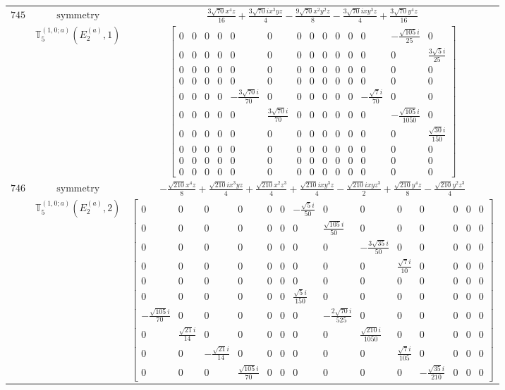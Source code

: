 \documentclass[fleqn,8pt,landscape]{jsarticle}
\begin{document}
\begin{longtable}{ccc}
$ 745 $ & $ \text{symmetry} $ & $ \frac{3 \sqrt{70} x^{4} z}{16} + \frac{3 \sqrt{70} i x^{3} y z}{4} - \frac{9 \sqrt{70} x^{2} y^{2} z}{8} - \frac{3 \sqrt{70} i x y^{3} z}{4} + \frac{3 \sqrt{70} y^{4} z}{16} $ \\
$  $ & $ \mathbb{T}_{5}^{(1,0;a)}(E_{2}^{(a)},1) $ & $ \begin{bmatrix} 0 & 0 & 0 & 0 & 0 & 0 & 0 & 0 & 0 & 0 & 0 & 0 & - \frac{\sqrt{105} i}{25} & 0 \\ 0 & 0 & 0 & 0 & 0 & 0 & 0 & 0 & 0 & 0 & 0 & 0 & 0 & \frac{3 \sqrt{5} i}{25} \\ 0 & 0 & 0 & 0 & 0 & 0 & 0 & 0 & 0 & 0 & 0 & 0 & 0 & 0 \\ 0 & 0 & 0 & 0 & 0 & 0 & 0 & 0 & 0 & 0 & 0 & 0 & 0 & 0 \\ 0 & 0 & 0 & 0 & - \frac{3 \sqrt{70} i}{70} & 0 & 0 & 0 & 0 & 0 & 0 & - \frac{\sqrt{7} i}{70} & 0 & 0 \\ 0 & 0 & 0 & 0 & 0 & \frac{3 \sqrt{70} i}{70} & 0 & 0 & 0 & 0 & 0 & 0 & - \frac{\sqrt{105} i}{1050} & 0 \\ 0 & 0 & 0 & 0 & 0 & 0 & 0 & 0 & 0 & 0 & 0 & 0 & 0 & \frac{\sqrt{30} i}{150} \\ 0 & 0 & 0 & 0 & 0 & 0 & 0 & 0 & 0 & 0 & 0 & 0 & 0 & 0 \\ 0 & 0 & 0 & 0 & 0 & 0 & 0 & 0 & 0 & 0 & 0 & 0 & 0 & 0 \\ 0 & 0 & 0 & 0 & 0 & 0 & 0 & 0 & 0 & 0 & 0 & 0 & 0 & 0 \end{bmatrix} $ \\ \hline
$ 746 $ & $ \text{symmetry} $ & $ - \frac{\sqrt{210} x^{4} z}{8} + \frac{\sqrt{210} i x^{3} y z}{4} + \frac{\sqrt{210} x^{2} z^{3}}{4} + \frac{\sqrt{210} i x y^{3} z}{4} - \frac{\sqrt{210} i x y z^{3}}{2} + \frac{\sqrt{210} y^{4} z}{8} - \frac{\sqrt{210} y^{2} z^{3}}{4} $ \\
$  $ & $ \mathbb{T}_{5}^{(1,0;a)}(E_{2}^{(a)},2) $ & $ \begin{bmatrix} 0 & 0 & 0 & 0 & 0 & 0 & - \frac{\sqrt{5} i}{50} & 0 & 0 & 0 & 0 & 0 & 0 & 0 \\ 0 & 0 & 0 & 0 & 0 & 0 & 0 & \frac{\sqrt{105} i}{50} & 0 & 0 & 0 & 0 & 0 & 0 \\ 0 & 0 & 0 & 0 & 0 & 0 & 0 & 0 & - \frac{3 \sqrt{35} i}{50} & 0 & 0 & 0 & 0 & 0 \\ 0 & 0 & 0 & 0 & 0 & 0 & 0 & 0 & 0 & \frac{\sqrt{7} i}{10} & 0 & 0 & 0 & 0 \\ 0 & 0 & 0 & 0 & 0 & 0 & 0 & 0 & 0 & 0 & 0 & 0 & 0 & 0 \\ 0 & 0 & 0 & 0 & 0 & 0 & \frac{\sqrt{5} i}{150} & 0 & 0 & 0 & 0 & 0 & 0 & 0 \\ - \frac{\sqrt{105} i}{70} & 0 & 0 & 0 & 0 & 0 & 0 & - \frac{2 \sqrt{70} i}{525} & 0 & 0 & 0 & 0 & 0 & 0 \\ 0 & \frac{\sqrt{21} i}{14} & 0 & 0 & 0 & 0 & 0 & 0 & \frac{\sqrt{210} i}{1050} & 0 & 0 & 0 & 0 & 0 \\ 0 & 0 & - \frac{\sqrt{21} i}{14} & 0 & 0 & 0 & 0 & 0 & 0 & \frac{\sqrt{7} i}{105} & 0 & 0 & 0 & 0 \\ 0 & 0 & 0 & \frac{\sqrt{105} i}{70} & 0 & 0 & 0 & 0 & 0 & 0 & - \frac{\sqrt{35} i}{210} & 0 & 0 & 0 \end{bmatrix} $ \\ \hline

\end{longtable}
\end{document}
